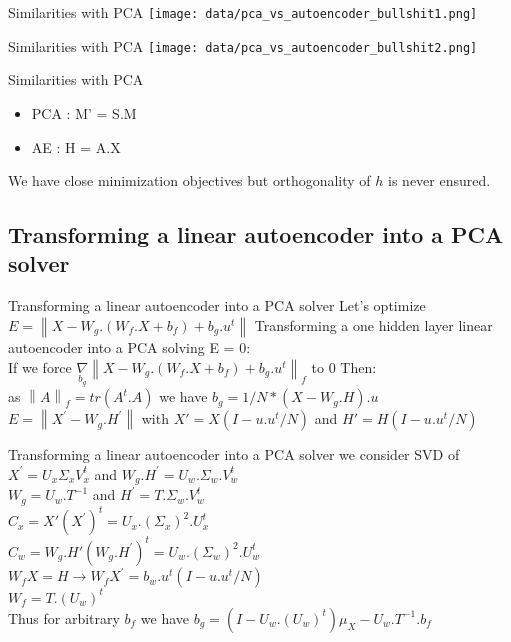 \documentclass{beamer}
\newcommand{\norm}[1]{\left\lVert#1\right\rVert}
\begin{document}
\begin{frame}{Similarities with PCA}
    \texttt{[image: data/pca\_vs\_autoencoder\_bullshit1.png]}
\end{frame}

\begin{frame}{Similarities with PCA}
    \texttt{[image: data/pca\_vs\_autoencoder\_bullshit2.png]}
\end{frame}

\begin{frame}{Similarities with PCA}
	\begin{itemize}
		\item PCA : M' = S.M  
		\item AE : H = A.X
	\end{itemize}
We have close minimization objectives but orthogonality of $h$ is never ensured.
\end{frame}


\subsection{Transforming a linear autoencoder into a PCA solver}
\begin{frame}{Transforming a linear autoencoder into a PCA solver}
	Let's optimize $E = \norm{ X - W_g.(W_f.X + b_f) + b_g.u^{t}}$
	Transforming a one hidden layer linear autoencoder into a PCA solving E = 0: \\
	If we force $\underset{b_g}\nabla  \norm{ X - W_g.(W_f.X + b_f) + b_g.u^{t}}_f$ to 0
	Then: \\
	as $\norm{A}_{f} = tr(A^{t}.A)$  we have $b_{g} = 1/N * (X - W_{g}.H).u $ \\
	$E = \norm{X^{'} - W_{g}.H^{'}}$ with $X' = X(I - u.u^{t}/N)$ and $H' = H(I - u.u^{t}/N)$ \\
\end{frame}
\begin{frame}{Transforming a linear autoencoder into a PCA solver}
	we consider SVD of $X^{'} = U_x\Sigma_{x}V_x^{t}$ and $W_g.H^{'} = U_w.\Sigma_{w}.V_w^{t}$ \\
	$W_g = U_w.T^{-1}$ and $H^{'} = T.\Sigma_w.V_w^{t}$ \\
	$C_x = X'(X^{'})^{t} = U_x.(\Sigma_x)^{2}.U_x^{t}$ \\
	$C_w = W_g.H'(W_g.H^{'})^{t} = U_w.(\Sigma_w)^{2}.U_w^{t}$ \\
	$W_{f}X = H \rightarrow W_{f}X^{'} = b_{w}.u^{t}(I - u.u^{t}/N)$ \\
	$W_{f} = T.(U_{w})^{t}$ \\
	Thus for arbitrary $b_{f}$ we have $b_{g} = (I - U_{w}.(U_{w})^{t})\mu_X - U_{w}.T^{-1}.b_{f}$
\end{frame}
\end{document}
